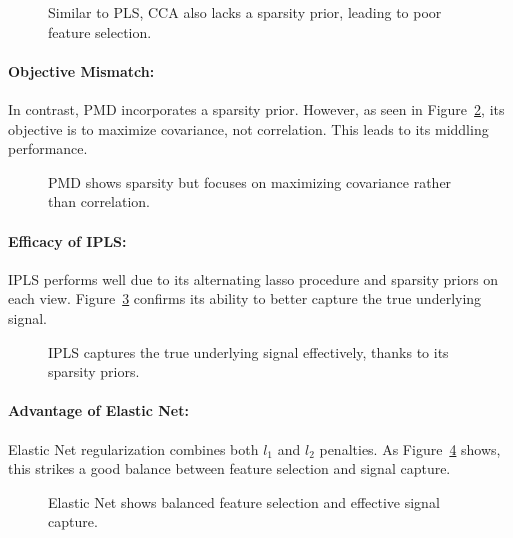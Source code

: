 \begin{figure}[h]
    \centering
    
    \caption{ Similar to PLS, CCA also lacks a sparsity prior, leading to poor feature selection.}
    \label{fig:CCA_weights}
\end{figure}

\paragraph{Objective Mismatch:}
In contrast, PMD incorporates a sparsity prior. However, as seen in Figure~\ref{fig:PMD_weights}, its objective is to maximize covariance, not correlation. This leads to its middling performance.

\begin{figure}[h]
    \centering
    
    \caption{PMD shows sparsity but focuses on maximizing covariance rather than correlation.}
    \label{fig:PMD_weights}
\end{figure}

\paragraph{Efficacy of IPLS:}
IPLS performs well due to its alternating lasso procedure and sparsity priors on each view. Figure~\ref{fig:IPLS_weights} confirms its ability to better capture the true underlying signal.

\begin{figure}[h]
    \centering
    
    \caption{IPLS captures the true underlying signal effectively, thanks to its sparsity priors.}
    \label{fig:IPLS_weights}
\end{figure}

\paragraph{Advantage of Elastic Net:}
Elastic Net regularization combines both $l_1$ and $l_2$ penalties. As Figure~\ref{fig:ElasticNet_weights} shows, this strikes a good balance between feature selection and signal capture.

\begin{figure}[h]
    \centering
    
    \caption{Elastic Net shows balanced feature selection and effective signal capture.}
    \label{fig:ElasticNet_weights}
\end{figure}

